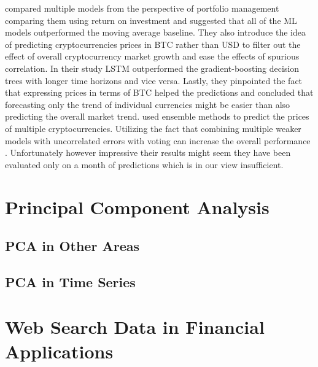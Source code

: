\cite{Alessandretti2018} compared multiple models from the perspective
of portfolio management comparing them using return on investment and
suggested that all of the \ac{ML} models outperformed the moving average baseline.
They also introduce the idea of predicting cryptocurrencies prices in \ac{BTC} 
rather than USD
to filter out the effect of overall cryptocurrency market growth and ease 
the effects of spurious correlation. In their study \ac{LSTM} outperformed 
the gradient-boosting decision trees with longer time horizons and vice versa.
Lastly, they pinpointed the fact that expressing prices in terms of \ac{BTC}
helped the predictions and concluded that forecasting only the trend of individual 
currencies might be easier than also predicting the overall market trend.
\cite{Chowdhury2020} used ensemble methods to predict the prices of multiple 
cryptocurrencies. Utilizing the fact that combining multiple weaker models
with uncorrelated errors with voting can increase the overall 
performance \cite[see Chapter 14.2]{bishop2006pattern}. 
Unfortunately however impressive their results might seem
they have been evaluated only on a month of predictions which is in our view insufficient.





\section{Principal Component Analysis}
\label{sec:pca}


\subsection{PCA in Other Areas}

\subsection{PCA in Time Series}


\section{Web Search Data in Financial Applications}





